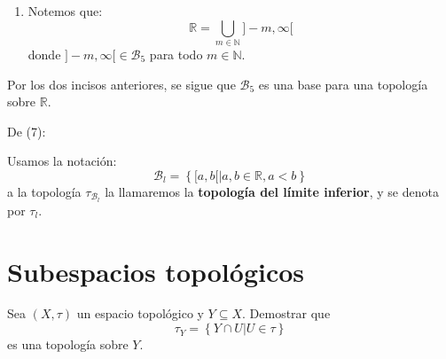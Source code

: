 \documentclass[12pt]{report}
\theoremstyle{largebreak}
\begin{document}
\begin{sol}
\begin{enumerate}
            \item Notemos que:
            \begin{equation}
                \mathbb{R}=\bigcup_{m\in\mathbb{N}}]-m,\infty[
            \end{equation}
            donde $]-m,\infty[\in\mathcal{B}_5$ para todo $m\in\mathbb{N}$.
        \end{enumerate}

        Por los dos incisos anteriores, se sigue que $\mathcal{B}_5$ es una base para una topología sobre $\mathbb{R}$.

        De (7):
    \end{sol}

    \begin{obs}
        Usamos la notación:
        \begin{equation*}
            \mathcal{B}_l=\left\{[a,b[\Big|a,b\in\mathbb{R},a<b \right\}
        \end{equation*}
        a la topología $\tau_{\mathcal{B}_l}$ la llamaremos la \textbf{topología del límite inferior}, y se denota por $\tau_l$.
    \end{obs}

    \section{Subespacios topológicos}

    \begin{excer}
        Sea $(X,\tau)$ un espacio topológico y $Y\subseteq X$. Demostrar que
        \begin{equation*}
            \tau_Y=\left\{Y\cap U\Big|U\in\tau \right\}
        \end{equation*}
        es una topología sobre $Y$.
    \end{excer}
\end{document}
